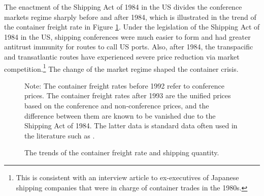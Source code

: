 \documentclass[11pt]{article}
\begin{document}
The enactment of the Shipping Act of 1984 in the US divides the conference markets regime sharply before and after 1984, which is illustrated in the trend of the container freight rate in Figure \ref{fg:container_freight_rate_and_shipping_quantity_each_route}. Under the legislation of the Shipping Act of 1984 in the US, shipping conferences were much easier to form and had greater antitrust immunity for routes to call US ports. Also, after 1984, the transpacific and transatlantic routes have experienced severe price reduction via market competition.\footnote{This is consistent with an interview article to ex-executives of Japanese shipping companies \citep{JapanMaritimeDaily2006} that were in charge of container trades in the 1980s.} The change of the market regime shaped the container crisis.



\begin{figure}[!ht]
\begin{center}
  \caption{The trends of the container freight rate and shipping quantity.}
  \label{fg:container_freight_rate_and_shipping_quantity_each_route}
  \end{center}
\footnotesize
   Note: The container freight rates before 1992 refer to conference prices. The container freight rates after 1993 are the unified prices based on the conference and non-conference prices, and the difference between them are known to be vanished due to the Shipping Act of 1984. The latter data is standard data often used in the literature such as \cite{jeon2017learning}.
\end{figure}
\end{document}

